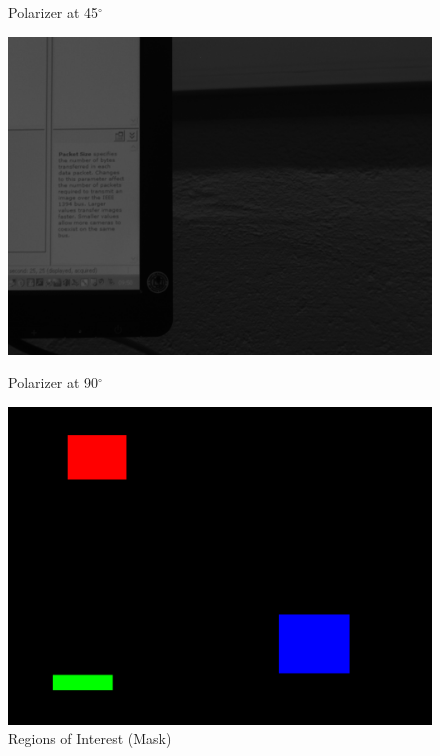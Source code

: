 \documentclass{article}
\begin{document}
\begin{figure}[H]
\begin{minipage}[b]{0.18\linewidth}
  \caption{Polarizer at 45$^\circ$}
  \label{fig:wolf1-2}
\end{minipage}
\quad
\begin{minipage}[b]{0.18\linewidth}
\includegraphics[width=1.0\textwidth,natwidth=100,natheight=100]{../wolff/results/im90.png}
  \caption{Polarizer at 90$^\circ$}
  \label{fig:wolf1-3}
\end{minipage}
\quad
\begin{minipage}[b]{0.18\linewidth}
\includegraphics[width=1.0\textwidth,natwidth=100,natheight=100]{../wolff/results/mask.png}
  \caption{Regions of Interest (Mask)}
  \label{fig:wolf1-4}
\end{minipage}
\end{figure}
\end{document}
